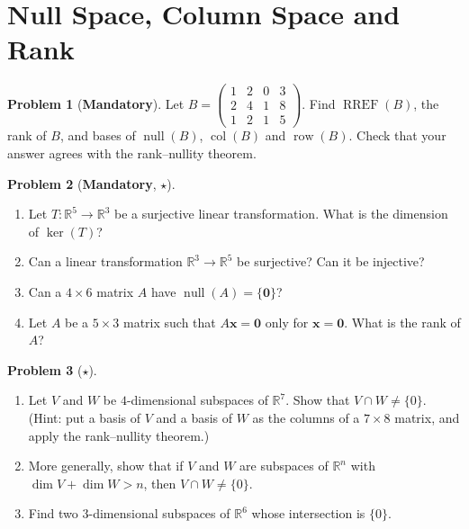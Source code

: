 \documentclass[11pt]{article}
\theoremstyle{definition}
\newtheorem{problem}{Problem}[section]
\newcommand{\mandatory}{\textcolor{red!70!black}{\textbf{Mandatory}}}
\DeclareMathOperator{\Null}{null}
\DeclareMathOperator{\col}{col}
\DeclareMathOperator{\row}{row}
\DeclareMathOperator{\RREF}{RREF}
\begin{document}
\section{Null Space, Column Space and Rank}

\begin{problem}[\mandatory]\label{pr:bases-B}
    Let $B = \begin{pmatrix} 1 & 2 & 0 & 3 \\ 2 & 4 & 1 & 8 \\ 1 & 2 & 1 & 5 \end{pmatrix}$. Find $\RREF(B)$, the rank of $B$, and bases of $\Null(B)$, $\col(B)$ and $\row(B)$. Check that your answer agrees with the rank--nullity theorem.
\end{problem}

\begin{problem}[\mandatory, $\star$]\label{pr:onto}
    \begin{enumerate}[label=(\alph*)]
        \item Let $T: \mathbb{R}^5 \to \mathbb{R}^3$ be a surjective linear transformation. What is the dimension of $\ker(T)$?
        \item Can a linear transformation $\mathbb{R}^3 \to \mathbb{R}^5$ be surjective? Can it be injective?
        \item Can a $4 \times 6$ matrix $A$ have $\Null(A) = \{\mathbf{0}\}$?
        \item Let $A$ be a $5 \times 3$ matrix such that $A\mathbf{x} = \mathbf{0}$ only for $\mathbf{x} = \mathbf{0}$. What is the rank of $A$?
    \end{enumerate}
\end{problem}

\begin{problem}[$\star$]\label{pr:intersect}
    \begin{enumerate}[label=(\alph*)]
        \item Let $V$ and $W$ be $4$-dimensional subspaces of $\mathbb{R}^7$. Show that $V \cap W \neq \{0\}$. (Hint: put a basis of $V$ and a basis of $W$ as the columns of a $7 \times 8$ matrix, and apply the rank--nullity theorem.)
        \item More generally, show that if $V$ and $W$ are subspaces of $\mathbb{R}^n$ with $\dim V + \dim W > n$, then $V \cap W \neq \{0\}$.
        \item Find two $3$-dimensional subspaces of $\mathbb{R}^6$ whose intersection is $\{0\}$.
    \end{enumerate}
\end{problem}
\end{document}
